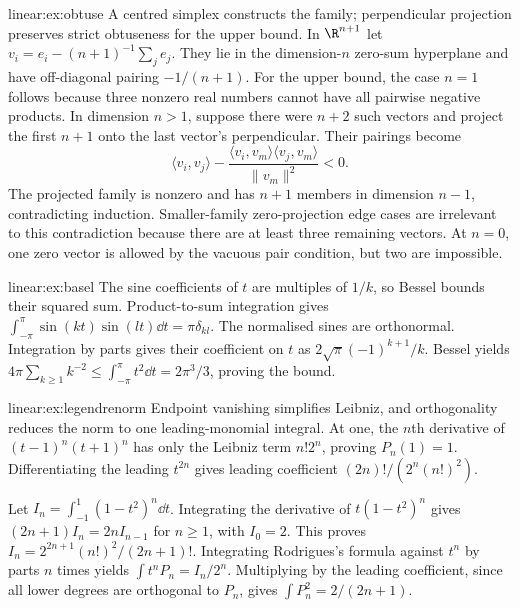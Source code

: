 \begin{solution}{linear:ex:obtuse}
\idea A centred simplex constructs the family; perpendicular projection preserves strict obtuseness for the upper bound.
\writeup In $\R^{n+1}$ let $v_i=e_i-(n+1)^{-1}\sum_je_j$. They lie in the dimension-$n$ zero-sum hyperplane and have off-diagonal pairing $-1/(n+1)$. For the upper bound, the case $n=1$ follows because three nonzero real numbers cannot have all pairwise negative products. In dimension $n>1$, suppose there were $n+2$ such vectors and project the first $n+1$ onto the last vector's perpendicular. Their pairings become
\[\langle v_i,v_j\rangle-\frac{\langle v_i,v_m\rangle\langle v_j,v_m\rangle}{\|v_m\|^2}<0.
\]
The projected family is nonzero and has $n+1$ members in dimension $n-1$, contradicting induction. Smaller-family zero-projection edge cases are irrelevant to this contradiction because there are at least three remaining vectors. At $n=0$, one zero vector is allowed by the vacuous pair condition, but two are impossible.
\end{solution}
\begin{solution}{linear:ex:basel}
\idea The sine coefficients of $t$ are multiples of $1/k$, so Bessel bounds their squared sum.
\writeup Product-to-sum integration gives $\int_{-\pi}^\pi\sin(kt)\sin(lt)\dd t=\pi\delta_{kl}$. The normalised sines are orthonormal. Integration by parts gives their coefficient on $t$ as $2\sqrt\pi(-1)^{k+1}/k$. Bessel yields $4\pi\sum_{k\ge1}k^{-2}\le\int_{-\pi}^\pi t^2\dd t=2\pi^3/3$, proving the bound.
\end{solution}
\begin{solution}{linear:ex:legendrenorm}
\idea Endpoint vanishing simplifies Leibniz, and orthogonality reduces the norm to one leading-monomial integral.
\writeup At one, the $n$th derivative of $(t-1)^n(t+1)^n$ has only the Leibniz term $n!2^n$, proving $P_n(1)=1$. Differentiating the leading $t^{2n}$ gives leading coefficient $(2n)!/(2^n(n!)^2)$.

Let $I_n=\int_{-1}^1(1-t^2)^n\dd t$. Integrating the derivative of $t(1-t^2)^n$ gives $(2n+1)I_n=2nI_{n-1}$ for $n\ge1$, with $I_0=2$. This proves $I_n=2^{2n+1}(n!)^2/(2n+1)!$. Integrating Rodrigues's formula against $t^n$ by parts $n$ times yields $\int t^nP_n=I_n/2^n$. Multiplying by the leading coefficient, since all lower degrees are orthogonal to $P_n$, gives $\int P_n^2=2/(2n+1)$.
\end{solution}
